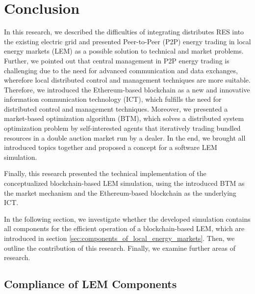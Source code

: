 \section{Conclusion}
In this research, we described the difficulties of integrating distributes RES into 
the existing electric grid and presented Peer-to-Peer (P2P) energy trading in local energy markets (LEM)
as a possible solution to technical and market problems. Further, we pointed out that central
management in P2P energy trading is challenging due to the need for advanced communication and data exchanges,
wherefore local distributed control and management techniques are more suitable.
Therefore, we introduced the Ethereum-based blockchain as a new and innovative information communication
technology (ICT), which fulfills the need for distributed control and management techniques.
Moreover, we presented a market-based optimization algorithm (BTM), which solves a distributed system
optimization problem by self-interested agents that iteratively trading bundled resources in a double
auction market run by a dealer. 
In the end, we brought all introduced topics together and proposed a concept for a software 
LEM simulation.

Finally, this research presented the technical implementation of the conceptualized blockchain-based
LEM simulation, using the introduced BTM as the market mechanism and 
the Ethereum-based blockchain as the underlying ICT.

In the following section, we investigate whether the developed simulation contains all components for the efficient operation of a blockchain-based LEM, which are introduced in section \ref{sec:components_of_local_energy_markets}. 
Then, we outline the contribution of this research. Finally, we examine further areas of research.

\subsection{Compliance of LEM Components}
\label{sec:compliance_of_components}

